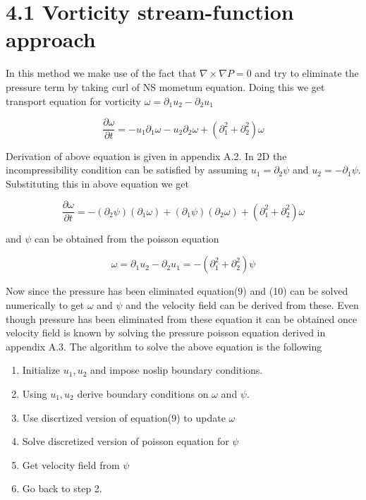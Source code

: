 \documentclass{article}		%
\begin{document}
\section*{ 4.1 Vorticity stream-function approach}  In this method we make use of the fact that $ \nabla \times \nabla P =0 $ and try to eliminate the pressure term by taking curl of NS mometum equation. Doing this we get transport equation for vorticity $\omega = \partial_1u_2 - \partial_2u_1$   

\begin{equation*}
\frac{\partial \omega}{\partial t} =  - u_1 \partial_1 \omega - u_2 \partial_2 \omega  + (\partial_1^2+ \partial_2^2) \omega 
\end{equation*}

Derivation of above equation is given in appendix A.2. In 2D the incompressibility condition can be satisfied by assuming $u_1 = \partial_2 \psi $ and $u_2 = -\partial_1 \psi $. Substituting this in above equation we get 

\begin{equation}
\frac{\partial \omega}{\partial t} =  - (\partial_2 \psi)( \partial_1 \omega) + (\partial_1 \psi)( \partial_2 \omega)  + (\partial_1^2+ \partial_2^2) \omega 
\end{equation}

and $\psi$ can be obtained from the poisson equation

\begin{equation}
\omega = \partial_1u_2 - \partial_2u_1 = -(\partial_1^2 + \partial_2^2) \psi  
\end{equation}

Now since the pressure has been eliminated equation(9) and (10) can be solved numerically to get $\omega$ and $\psi$ and the velocity field can be derived from these. Even though pressure has been eliminated from these equation it can be obtained once velocity field is known by solving the pressure poisson equation derived in appendix A.3. The algorithm to solve the above equation is the following

\newpage

\begin{enumerate}
	\item Initialize $u_1, u_2$ and impose noslip boundary conditions.
	\item  Using $u_1, u_2$ derive boundary conditions on  $\omega$ and $\psi$.
	\item Use discrtized version of equation(9) to update $\omega$ 
	\item Solve discretized version of poisson equation for $\psi$
	\item Get velocity field from $\psi$ 
	\item Go back to step 2.
\end{enumerate}
\end{document}
